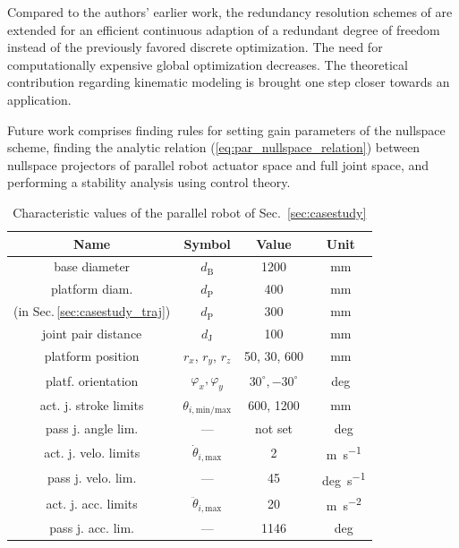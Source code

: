 \documentclass[a4paper,twoside]{article}
\begin{document}
Compared to the authors' earlier work, the redundancy resolution schemes of \cite{KotlarskiDoHeiOrt2010} are extended for an efficient continuous adaption of a redundant degree of freedom instead of the previously favored discrete optimization.
The need for computationally expensive global optimization decreases.
The theoretical contribution \cite{SchapplerTapOrt2019} regarding kinematic modeling is brought one step closer towards an application.

Future work comprises finding rules for setting gain parameters of the nullspace scheme, finding the analytic relation (\ref{eq:par_nullspace_relation}) between nullspace projectors of parallel robot actuator space and full joint space, and performing a stability analysis using control theory. %

\vspace{0.2cm} %

\begin{table}[hb] %
	\caption{Characteristic values of the parallel robot of Sec.~\ref{sec:casestudy}}
	\label{tab:hexapod_values}
	\centering
	\setlength\tabcolsep{3 pt}
	\begin{tabular}[t]{|c|c|c|c|}
		\hline
		\textbf{Name} & \textbf{Symbol} & \textbf{Value} & \textbf{Unit} \\
		\hline
		base diameter & $d_\mathrm{B}$ & 1200 &mm \\
		platform diam. & $d_\mathrm{P}$ & 400 & mm \\ %
		(in Sec.\,\ref{sec:casestudy_traj}) & $d_\mathrm{P}$ & 300 & mm \\
		joint pair distance & $d_\mathrm{J}$ & 100 & mm \\
		platform position & $r_x$, $r_y$, $r_z$ & 50, 30, 600 & mm \\
		platf. orientation & $\varphi_x, \varphi_y$ & $30^\circ,{-}30^\circ$ & deg \\
		act. j. stroke limits & $\theta_{i,\mathrm{min/max}}$ & 600, 1200 & mm\\ %
		pass j. angle lim. & --- & not set & \SI{}{deg}\\
		act. j. velo. limits & $\dot{\theta}_{i,\mathrm{max}}$ & 2 & \SI{}{\metre\per\second} \\
		pass j. velo. lim. & --- & 45 & \SI{}{deg\per\second}\\
		act. j. acc. limits & $\ddot{\theta}_{i,\mathrm{max}}$ & 20 & \SI{}{\metre\per\square\second} \\
		pass j. acc. lim. & --- & 1146 & \SI{}{deg\per\second\square}\\
		\hline
	\end{tabular}
\end{table}
\end{document}
